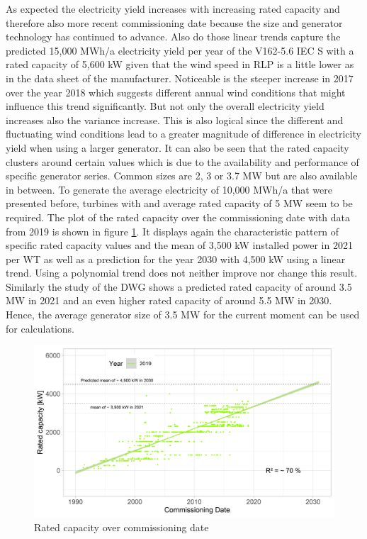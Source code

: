 \documentclass[a4paper,11pt]{article}
\begin{document}
As expected the electricity yield increases with increasing rated capacity and therefore also more recent commissioning date because the size and generator technology has continued to advance. Also do those linear trends capture the predicted 15,000 MWh/a electricity yield per year of the V162-5.6 IEC S with a rated capacity of 5,600 kW given that the wind speed in RLP is a little lower as in the data sheet of the manufacturer. Noticeable is the steeper increase in 2017 over the year 2018 which suggests different annual wind conditions that might influence this trend significantly. But not only the overall electricity yield increases also the variance increase. This is also logical since the different and fluctuating wind conditions lead to a greater magnitude of difference in electricity yield when using a larger generator. It can also be seen that the rated capacity clusters around certain values which is due to the availability and performance of specific generator series. Common sizes are 2, 3 or 3.7 MW but are also available in between. To generate the average electricity of 10,000 MWh/a that were presented before, turbines with and average rated capacity of 5 MW seem to be required. The plot of the rated capacity over the commissioning date with data from 2019 is shown in figure \ref{fig:ratedcapacity}. It displays again the characteristic pattern of specific rated capacity values and the mean of 3,500 kW installed power in 2021 per WT as well as a prediction for the year 2030 with 4,500 kW using a linear trend. Using a polynomial trend does not neither improve nor change this result. Similarly the study of the DWG shows a predicted rated capacity of around 3.5 MW in 2021 and an even higher rated capacity of around 5.5 MW in 2030. Hence, the average generator size of 3.5 MW for the current moment can be used for calculations.
\begin{figure}

{\centering \includegraphics[width=1\linewidth]{data/Amprion/results_of_analysis/rated_capacity_over_commissioning} 

}

\caption{Rated capacity over commissioning date}\label{fig:ratedcapacity}
\end{figure}
\newpage
\end{document}
